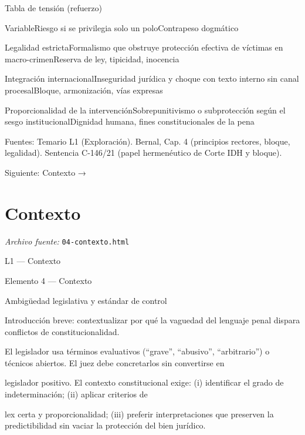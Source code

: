 \documentclass[11pt,a4paper]{article}
\begin{document}
      Tabla de tensión (refuerzo)\par



          VariableRiesgo si se privilegia solo un poloContrapeso dogmático\par




          Legalidad estrictaFormalismo que obstruye protección efectiva de víctimas en macro-crimenReserva de ley, tipicidad, inocencia\par

          Integración internacionalInseguridad jurídica y choque con texto interno sin canal procesalBloque, armonización, vías expresas\par

          Proporcionalidad de la intervenciónSobrepunitivismo o subprotección según el sesgo institucionalDignidad humana, fines constitucionales de la pena\par








      Fuentes: Temario L1 (Exploración). Bernal, Cap. 4 (principios rectores, bloque, legalidad). Sentencia C-146/21 (papel hermenéutico de Corte IDH y bloque).\par


    Siguiente: Contexto →\par

\section{Contexto}
\noindent\textit{Archivo fuente:} \texttt{04-contexto.html}

L1 — Contexto\par





    Elemento 4 — Contexto\par
    Ambigüedad legislativa y estándar de control\par

    Introducción breve: contextualizar por qué la vaguedad del lenguaje penal dispara conflictos de constitucionalidad.\par


      El legislador usa términos evaluativos (“grave”, “abusivo”, “arbitrario”) o técnicos abiertos. El juez debe concretarlos sin convertirse en\par
      legislador positivo. El contexto constitucional exige: (i) identificar el grado de indeterminación; (ii) aplicar criterios de\par
      lex certa y proporcionalidad; (iii) preferir interpretaciones que preserven la predictibilidad sin vaciar la protección del bien jurídico.\par
\end{document}
